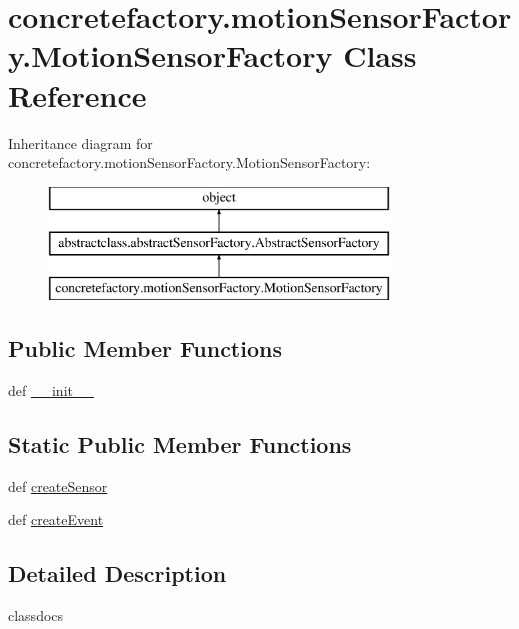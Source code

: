 \hypertarget{classconcretefactory_1_1motionSensorFactory_1_1MotionSensorFactory}{}\section{concretefactory.\+motion\+Sensor\+Factory.\+Motion\+Sensor\+Factory Class Reference}
\label{classconcretefactory_1_1motionSensorFactory_1_1MotionSensorFactory}
Inheritance diagram for concretefactory.\+motion\+Sensor\+Factory.\+Motion\+Sensor\+Factory\+:\begin{figure}[H]
\begin{center}
\leavevmode
\includegraphics[height=3.000000cm]{classconcretefactory_1_1motionSensorFactory_1_1MotionSensorFactory}
\end{center}
\end{figure}
\subsection*{Public Member Functions}
\begin{DoxyCompactItemize}
\item 
def \hyperlink{classconcretefactory_1_1motionSensorFactory_1_1MotionSensorFactory_a7c9cabf8b898c24e9dc5398256f2cdf1}{\+\_\+\+\_\+init\+\_\+\+\_\+}
\end{DoxyCompactItemize}
\subsection*{Static Public Member Functions}
\begin{DoxyCompactItemize}
\item 
def \hyperlink{classconcretefactory_1_1motionSensorFactory_1_1MotionSensorFactory_a34e03c8f0321aa4b610df0a504b82834}{create\+Sensor}
\item 
def \hyperlink{classconcretefactory_1_1motionSensorFactory_1_1MotionSensorFactory_a0afeac42c173195370faeb2a55d196c1}{create\+Event}
\end{DoxyCompactItemize}


\subsection{Detailed Description}
\begin{DoxyVerb}classdocs
\end{DoxyVerb}
 

